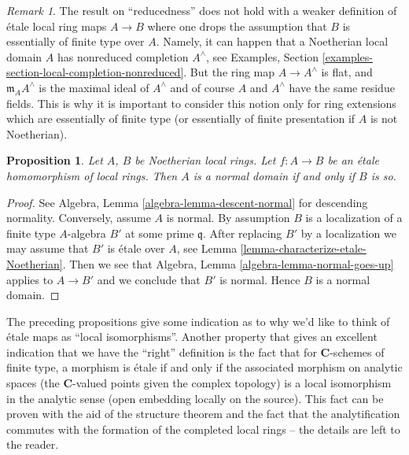 \documentclass{stacks-project}
\newenvironment{reference}{\comment}{\endcomment}
\theoremstyle{plain}
\newtheorem{proposition}[subsection]{Proposition}
\theoremstyle{definition}
\theoremstyle{remark}
\newtheorem{remark}[subsection]{Remark}
\numberwithin{equation}{subsection}
\begin{document}
\begin{remark}
\label{remark-technicality-needed}
The result on ``reducedness'' does not hold with a weaker
definition of \'etale local ring maps $A \to B$ where one
drops the assumption that $B$ is essentially of finite type over $A$.
Namely, it can happen that a Noetherian local domain $A$ has nonreduced
completion $A^\wedge$, see
Examples, Section \ref{examples-section-local-completion-nonreduced}.
But the ring map $A \to A^\wedge$ is flat, and $\mathfrak m_AA^\wedge$
is the maximal ideal of $A^\wedge$ and of course $A$ and $A^\wedge$ have
the same residue fields. This is why it is important to consider
this notion only for ring extensions which are essentially of finite type
(or essentially of finite presentation if $A$ is not Noetherian).
\end{remark}

\begin{proposition}
\label{proposition-etale-normal}
\begin{reference}
\cite[Expose I, Theorem 9.5 part (i)]{SGA1}
\end{reference}
Let $A$, $B$ be Noetherian local rings.
Let $f : A \to B$ be an \'etale homomorphism of local rings.
Then $A$ is a normal domain if and only if $B$ is so.
\end{proposition}

\begin{proof}
See
Algebra, Lemma \ref{algebra-lemma-descent-normal}
for descending normality. Conversely, assume $A$ is normal.
By assumption $B$ is a localization of a finite type $A$-algebra
$B'$ at some prime $\mathfrak q$. After replacing $B'$ by a localization
we may assume that $B'$ is \'etale over $A$, see
Lemma \ref{lemma-characterize-etale-Noetherian}.
Then we see that
Algebra, Lemma \ref{algebra-lemma-normal-goes-up}
applies to $A \to B'$ and we conclude that $B'$ is normal.
Hence $B$ is a normal domain.
\end{proof}

\noindent
The preceding propositions give some indication as to why we'd like to think
of \'etale maps as ``local isomorphisms''. Another property that gives an
excellent indication that we have the ``right'' definition is the fact that
for $\mathbf{C}$-schemes of finite type, a morphism is \'etale if and only if
the associated morphism on analytic spaces (the $\mathbf{C}$-valued points given
the complex topology) is a local isomorphism in the analytic sense (open
embedding locally on the source). This fact can be proven with the aid of the
structure theorem and the fact that the analytification commutes with the
formation of the completed local rings -- the details are left to the reader.
\end{document}
